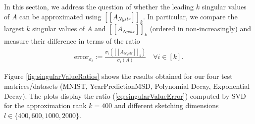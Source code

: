 \documentclass{article}
\theoremstyle{definition}
\begin{document}
In this section, we address the question of whether the leading $k$ singular values of $A$ can be approximated using $[\![A_{Nystr}]\!]_k$. In particular, we compare the largest $k$ singular values of $A$ and $[\![A_{Nystr}]\!]_k$ (ordered in non-increasingly) and measure their difference in terms of the ratio
\begin{align}
    \label{eq:singularValueError}
    \text{error}_{\sigma_i} := \frac{\sigma_i([\![A_{Nystr}]\!]_k)}{\sigma_i(A)}
    \quad \forall i \in [k].
\end{align}

Figure \ref{fig:singularValueRatios} shows the results obtained for our four test matrices/datasets (MNIST, YearPredictionMSD, Polynomial Decay, Exponential Decay). The plots display the ratio (\ref{eq:singularValueError}) computed by SVD for the approximation rank $k=400$ and different sketching dimensions $l \in \{400, 600, 1000, 2000\}$.
\end{document}
